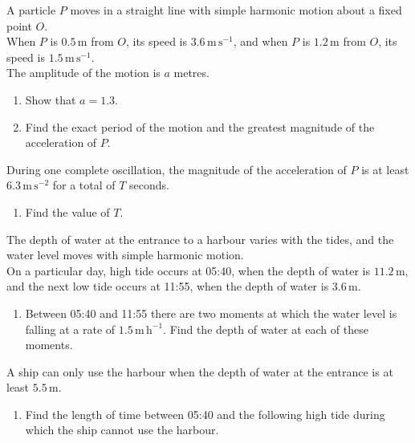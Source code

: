 \documentclass[leqno]{article}
\begin{document}
\begin{enumerate}[
  label=\textbf{\arabic*.},
  leftmargin=*,
  topsep=0pt,
  partopsep=0pt,
  parsep=0pt
]
\newpage

\questionitem

A particle $P$ moves in a straight line with simple harmonic motion about a fixed point $O$. \\
When $P$ is $0.5\,\mathrm{m}$ from $O$, its speed is $3.6\,\mathrm{m\,s^{-1}}$, and when $P$ is $1.2\,\mathrm{m}$ from $O$, its speed is $1.5\,\mathrm{m\,s^{-1}}$. \\
The amplitude of the motion is $a$ metres. \\
\begin{enumerate}[label=\textbf{(\alph*)}]
\item Show that $a=1.3$.  \\
\item Find the exact period of the motion and the greatest magnitude of the acceleration of $P$.  \\
\end{enumerate}
During one complete oscillation, the magnitude of the acceleration of $P$ is at least $6.3\,\mathrm{m\,s^{-2}}$ for a total of $T$ seconds. \\
\begin{enumerate}[resume, label=\textbf{(\alph*)}]
\item Find the value of $T$.  \\
\end{enumerate}

\newpage

\questionitem

The depth of water at the entrance to a harbour varies with the tides, and the water level moves with simple harmonic motion. \\
On a particular day, high tide occurs at 05:40, when the depth of water is $11.2\,\mathrm{m}$, and the next low tide occurs at 11:55, when the depth of water is $3.6\,\mathrm{m}$. \\
\begin{enumerate}[label=\textbf{(\alph*)}]
  \item Between 05:40 and 11:55 there are two moments at which the water level is falling at a rate of $1.5\,\mathrm{m\,h^{-1}}$. Find the depth of water at each of these moments.  \\
\end{enumerate}
A ship can only use the harbour when the depth of water at the entrance is at least $5.5\,\mathrm{m}$. \\
\begin{enumerate}[label=\textbf{(\alph*)}, resume]
  \item Find the length of time between 05:40 and the following high tide during which the ship cannot use the harbour.  \\
\end{enumerate}


\end{enumerate}
\end{document}
